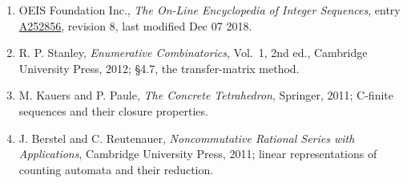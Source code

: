 \documentclass[11pt]{article}
\theoremstyle{definition}
\begin{document}
\begin{enumerate}

\item OEIS Foundation Inc., \emph{The On-Line Encyclopedia of Integer Sequences}, entry \href{https://oeis.org/A252856}{A252856}, revision 8, last modified Dec 07 2018.

\item R. P. Stanley, \emph{Enumerative Combinatorics}, Vol.~1, 2nd ed., Cambridge University Press, 2012; \S4.7, the transfer-matrix method.

\item M. Kauers and P. Paule, \emph{The Concrete Tetrahedron}, Springer, 2011; C-finite sequences and their closure properties.

\item J. Berstel and C. Reutenauer, \emph{Noncommutative Rational Series with Applications}, Cambridge University Press, 2011; linear representations of counting automata and their reduction.

\end{enumerate}
\end{document}
